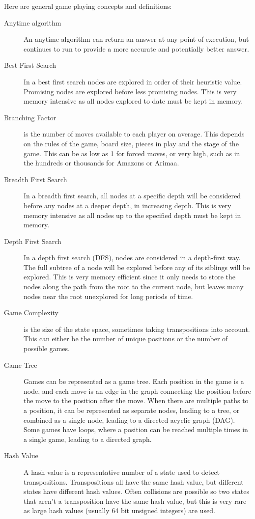 
Here are general game playing concepts and definitions:

\begin{description}
\item[Anytime algorithm] An anytime algorithm can return an answer at any point of execution, but continues to run to provide a more accurate and potentially better answer.
\item[Best First Search] In a best first search nodes are explored in order of their heuristic value. Promising nodes are explored before less promising nodes. This is very memory intensive as all nodes explored to date must be kept in memory.
\item[Branching Factor] is the number of moves available to each player on average. This depends on the rules of the game, board size, pieces in play and the stage of the game. This can be as low as 1 for forced moves, or very high, such as in the hundreds or thousands for Amazons or Arimaa.
\item[Breadth First Search] In a breadth first search, all nodes at a specific depth will be considered before any nodes at a deeper depth, in increasing depth. This is very memory intensive as all nodes up to the specified depth must be kept in memory.
\item[Depth First Search] In a depth first search (DFS), nodes are considered in a depth-first way. The full subtree of a node will be explored before any of its siblings will be explored. This is very memory efficient since it only needs to store the nodes along the path from the root to the current node, but leaves many nodes near the root unexplored for long periods of time.
\item[Game Complexity] is the size of the state space, sometimes taking transpositions into account. This can either be the number of unique positions or the number of possible games.
\item[Game Tree] Games can be represented as a game tree. Each position in the game is a node, and each move is an edge in the graph connecting the position before the move to the position after the move. When there are multiple paths to a position, it can be represented as separate nodes, leading to a tree, or combined as a single node, leading to a directed acyclic graph (DAG). Some games have loops, where a position can be reached multiple times in a single game, leading to a directed graph.
\item[Hash Value] A hash value is a representative number of a state used to detect transpositions. Transpositions all have the same hash value, but different states have different hash values. Often collisions are possible so two states that aren't a transposition have the same hash value, but this is very rare as large hash values (usually 64 bit unsigned integers) are used.

\end{description}
